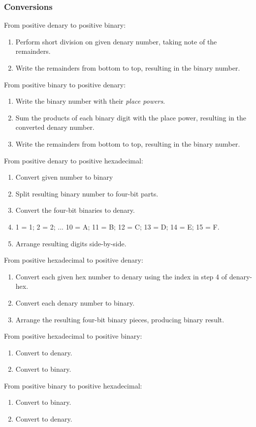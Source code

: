 \documentclass[twocolumn]{article}
\begin{document}
\subsubsection*{Conversions}
From positive denary to positive binary:
\begin{enumerate}
	\item Perform short division on given denary number, taking note of the remainders.
	\item Write the remainders from bottom to top, resulting in the binary number.
\end{enumerate}
From positive binary to positive denary:
\begin{enumerate}
	\item Write the binary number with their \textit{place powers}.
	\item Sum the products of each binary digit with the place power, resulting in the
		converted denary number.
	\item Write the remainders from bottom to top, resulting in the binary number.
\end{enumerate}
From positive denary to positive hexadecimal:
\begin{enumerate}
	\item Convert given number to binary
	\item Split resulting binary number to four-bit parts.
	\item Convert the four-bit binaries to denary.
	\item 1 = 1; 2 = 2; ... 10 = A; 11 = B; 12 = C; 13 = D; 14 = E; 15 = F.
	\item Arrange resulting digits side-by-side.
\end{enumerate}
From positive hexadecimal to positive denary:
\begin{enumerate}
	\item Convert each given hex number to denary using the index in step 4 of 
		denary-hex.
	\item Convert each denary number to binary.
	\item Arrange the resulting four-bit binary pieces, producing binary result.
\end{enumerate}
From positive hexadecimal to positive binary:
\begin{enumerate}
	\item Convert to denary.
	\item Convert to binary.
\end{enumerate}
From positive binary to positive hexadecimal:
\begin{enumerate}
	\item Convert to binary.
	\item Convert to denary.
\end{enumerate}
\end{document}
